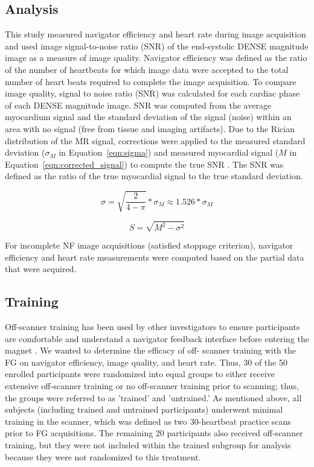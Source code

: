 \subsection{Analysis}
	This study measured navigator efficiency and heart rate during image acquisition and used image signal-to-noise ratio (SNR) of the end-systolic DENSE magnitude image as a measure of image quality. Navigator efficiency was defined as the ratio of the number of heartbeats for which image data were accepted to the total number of heart beats required to complete the image acquisition. To compare image quality, signal to noise ratio (SNR) was calculated for each cardiac phase of each DENSE magnitude image. SNR was computed from the average myocardium signal and the standard deviation of the signal (noise) within an area with no signal (free from tissue and imaging artifacts). Due to the Rician distribution of the MR signal, corrections were applied to the measured standard deviation ($\sigma_M$ in Equation~\ref{eqn:sigma}) and measured myocardial signal ($M$ in Equation~\ref{eqn:corrected_signal}) to compute the true SNR \cite{Wehner2015,Wehner2015a,Gudbjartsson1995}. The SNR was defined as the ratio of the true myocardial signal to the true standard deviation.

\begin{equation}
	\label{eqn:sigma}
	\sigma = \sqrt{\frac{2}{4-\pi}}*\sigma_M \approx 1.526*\sigma_M
\end{equation}

\begin{equation}
	\label{eqn:corrected_signal}
	S= \sqrt{M^2-\sigma^2}
\end{equation}

	For incomplete NF image acquisitions (satisfied stoppage criterion), navigator efficiency and heart rate measurements were computed based on the partial data that were acquired.

\subsection{Training}
	Off-scanner training has been used by other investigators to ensure participants are comfortable and understand a navigator feedback interface before entering the magnet \cite{Feuerlein2009}. We wanted to determine the efficacy of off- scanner training with the FG on navigator efficiency, image quality, and heart rate. Thus, 30 of the 50 enrolled participants were randomized into equal groups to either receive extensive off-scanner training or no off-scanner training prior to scanning; thus, the groups were referred to as 'trained' and 'untrained.' As mentioned above, all subjects (including trained and untrained participants) underwent minimal training in the scanner, which was defined as two 30-heartbeat practice scans prior to FG acquisitions. The remaining 20 participants also received off-scanner training, but they were not included within the trained subgroup for analysis because they were not randomized to this treatment.
	
